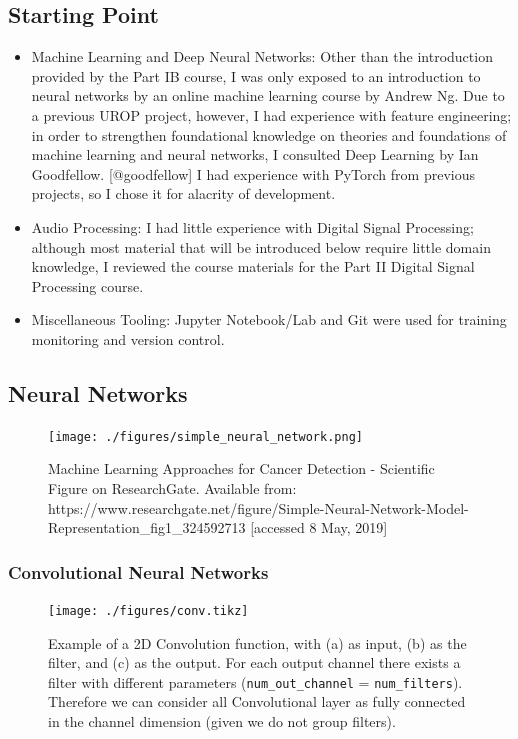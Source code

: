 \documentclass[]{article}
\begin{document}
\hypertarget{starting-point}{%
\subsection{Starting Point}\label{starting-point}}

\begin{itemize}
\item
  Machine Learning and Deep Neural Networks: Other than the introduction
  provided by the Part IB course, I was only exposed to an introduction
  to neural networks by an online machine learning course by Andrew Ng.
  Due to a previous UROP project, however, I had experience with feature
  engineering; in order to strengthen foundational knowledge on theories
  and foundations of machine learning and neural networks, I consulted
  Deep Learning by Ian Goodfellow. {[}@goodfellow{]} I had experience
  with PyTorch from previous projects, so I chose it for alacrity of
  development.
\item
  Audio Processing: I had little experience with Digital Signal
  Processing; although most material that will be introduced below
  require little domain knowledge, I reviewed the course materials for
  the Part II Digital Signal Processing course.
\item
  Miscellaneous Tooling: Jupyter Notebook/Lab and Git were used for
  training monitoring and version control.
\end{itemize}

\hypertarget{neural-networks}{%
\subsection{Neural Networks}\label{neural-networks}}

\begin{figure}[h]
    \texttt{[image: ./figures/simple\_neural\_network.png]}
\centering
\caption{Machine Learning Approaches for Cancer Detection - Scientific Figure on ResearchGate. Available from: https://www.researchgate.net/figure/Simple-Neural-Network-Model-Representation\_fig1\_324592713 [accessed 8 May, 2019]}
\end{figure}

\hypertarget{convolutional-neural-networks}{%
\subsubsection{Convolutional Neural
Networks}\label{convolutional-neural-networks}}

\begin{figure}[h]
    \texttt{[image: ./figures/conv.tikz]}
    \centering
    \caption{Example of a 2D Convolution function, with (a) as input, (b) as the filter, and (c) as the output. For each output channel there exists a filter with different parameters (\texttt{num\_out\_channel} = \texttt{num\_filters}). Therefore we can consider all Convolutional layer as fully connected in the channel dimension (given we do not group filters).}
\end{figure}
\end{document}
